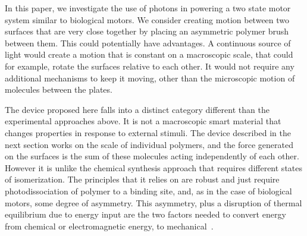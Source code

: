 \documentclass[journal = mamobx, manuscript = article]{achemso}
\begin{document}
In this paper, we investigate the use of photons in powering a two state motor
system similar to biological motors. We consider
creating motion between two surfaces that are very close together by placing
an asymmetric polymer brush between them.
This could potentially have advantages. A continuous source of light would create
a motion that is constant on a macroscopic scale, that could for example, rotate
the surfaces relative to each other. It would not require any additional
mechanisms to keep it moving, other than the microscopic motion of molecules
between the plates. 

The device proposed here falls into a distinct category different than the
experimental approaches above. It is not a macroscopic smart
material that changes properties in response to external stimuli. The device
described in the next section works on the scale of individual polymers, 
and the force generated on the surfaces is the sum of these molecules
acting independently of each other. However it is unlike the chemical synthesis
approach that requires different states of isomerization. The principles
that it relies on are robust and just require
photodissociation of polymer to a binding site, and, as in the case of biological
motors, some degree of asymmetry.
This asymmetry, plus a disruption of thermal equilibrium due to energy input
are the two factors needed to convert energy from chemical or electromagnetic energy, to
mechanical~\cite{ProstPRL}.
\end{document}
